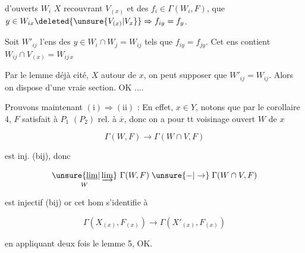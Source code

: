 
d'ouverts $W_i$  $X$ recouvrant $V_{(x)}$  et des $f_i\in\Gamma(W_i,F)$,  que $y\in W_{ix}\deleted{\unsure{V_{(x)}|V_x}}\Rightarrow f_{iy}=f_y$.

Soit  $W'_{ij}$ l'ens des $y\in W_i\cap W_j=W_{ij}$ tels que $f_{iy}=f_{jy}$. Cet ens   contient $W_{ij}\cap V_{(x)}=W_{ij\,x}$

Par le lemme  déjà cité,  $X$  autour de $x$, on peut supposer que $W'_{ij}=W_{ij}$. Alors on dispose d'une vraie section. OK ....


Prouvons maintenant $(\mathrm{i})\Rightarrow(\mathrm{ii})$ : En effet,  $x\in Y$,  notons que par le  corollaire 4, $F$ satisfait à $P_1$ $(P_2)$ rel. à $\overline x$, donc  on a pour tt voisinage ouvert $W$ de $x$

\[
\Gamma(W,F)\longrightarrow\Gamma(W\cap V,F)
\]

est inj. (bij), donc

\[
\underset{W}{\unsure{\underline{\lim}|\varinjlim}}\ \Gamma(W,F)\mathrel{\unsure{-|\to}}\Gamma(W\cap V,F)
\]

est injectif (bij) or cet hom s'identifie à

\[
\Gamma(X_{(x)},F_{(x)})\longrightarrow\Gamma(X'_{(x)},F_{(x)})
\]

en appliquant deux fois le lemme 5, OK.

